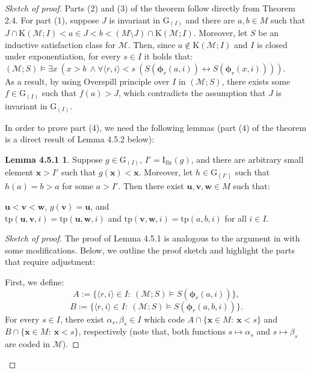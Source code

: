 \documentclass[11pt]{article}
\theoremstyle{plain}
\theoremstyle{definition}
\newcommand{\M}{\mathcal{M}}
\newcommand{\I}{\mathrm{I_{fix}}}
\newcommand{\G}{\mathrm{G}}
\newcommand{\KK}{\mathrm{K}}
\newcommand{\tp}{\mathrm{tp}}
\begin{document}
\begin{proof}[Sketch of proof]
Parts (2) and (3) of the theorem follow directly from Theorem 2.4. For part (1), suppose $J$ is invariant in $\G_{(I)}$ and there are $a,b\in M$ such that $J\cap\KK(\M;I)<a\in J<b<(M\setminus J)\cap\KK(\M;I)$. Moreover, let $S$ be an inductive satisfaction class for $\M$. Then, since $a\notin\KK(\M;I)$ and $I$ is closed under exponentiation, for every $s\in I$ it holds that:\\

$(\M;S)\models\exists x \ (x>b \ \wedge \forall \langle r,i\rangle<s \ (S(\bm{\phi}_{r}(a,i))\leftrightarrow S(\bm{\phi}_{r}(x,i)))).$\\

As a result, by using Overspill principle over $I$ in $(\M;S)$, there exists some $f\in\G_{(I)}$ such that $f(a)>J$, which contradicts the assumption that $J$ is invariant in $\G_{(I)}$.

In order to prove part (4), we need the following lemmas (part (4) of the theorem is a direct result of Lemma 4.5.2 below):

\theoremstyle{nonum}
\newtheorem{lemm}{Lemma 4.5.1}
\theoremstyle{nonum}
\begin{lemm}
	Suppose $g\in\G_{(I)}$, $I'=\I(g)$, and there are arbitrary small element $\textbf{x}>I'$ such that $g(\textbf{x})<\textbf{x}$. Moreover, let $h\in\G_{(I')}$ such that $h(a)=b>a$ for some $a>I'$. Then there exist $\textbf{u},\textbf{v},\textbf{w}\in M$ such that:
	\begin{center}
		$ \textbf{u}<\textbf{v}<\textbf{w}$, $g(\textbf{v})=\textbf{u}$, and\\ $\tp(\textbf{u},\textbf{v},i)=\tp(\textbf{u},\textbf{w},i)$ and $\tp(\textbf{v},\textbf{w},i)=\tp(a,b
		,i)$ for all $i\in I$.
	\end{center}
\end{lemm}
\begin{proof}[Sketch of proof]
The proof of Lemma 4.5.1 is analogous to the argument in \cite{sch1} with some modifications. Below, we outline the proof sketch and highlight the parts that require adjustment:

First, we define:
$$ A:=\{\langle r,i\rangle\in I: \ (\M;S)\models S(\bm{\phi}_{r}(a,i))\},$$
$$ B:=\{\langle r,i\rangle\in I: \ (\M;S)\models S(\bm{\phi}_{r}(a,b,i))\}.$$
For every $s\in I$, there exist $\alpha_{s},\beta_{s}\in I$ which code $A\cap \{\textbf{x}\in M: \ \textbf{x}<s\}$ and ${B\cap \{\textbf{x}\in M: \ \textbf{x}<s\}}$, respectively (note that, both functions $s\mapsto\alpha_{s}$ and $s\mapsto\beta_{s}$ are coded in $\M$). 


\end{proof}
\end{proof}
\end{document}
